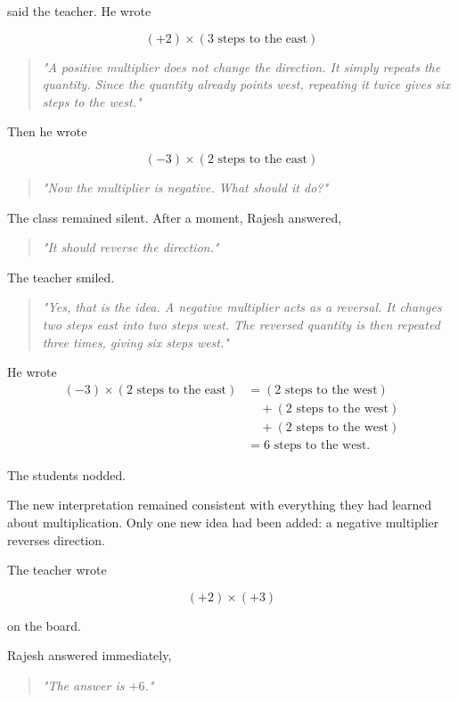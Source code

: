 \documentclass[11pt]{article}
\begin{document}
said the teacher.  He wrote

\[
(+2)\times(\text{3 steps to the east})
\]

\begin{quote}
\emph{"A positive multiplier does not change the direction. It simply repeats the quantity. Since the quantity already points west, repeating it twice gives six steps to the west."}
\end{quote}

Then he wrote

\[
(-3)\times(\text{2 steps to the east})
\]

\begin{quote}
\emph{"Now the multiplier is negative. What should it do?"}
\end{quote}

The class remained silent. After a moment, Rajesh answered,

\begin{quote}
\emph{"It should reverse the direction."}
\end{quote}

The teacher smiled.

\begin{quote}
\emph{"Yes, that is the idea. A negative multiplier acts as a reversal. It changes two steps east into two steps west. The reversed quantity is then repeated three times, giving six steps west."}
\end{quote}

He wrote
\[
\begin{aligned}
(-3)\times(\text{2 steps to the east})
&=(\text{2 steps to the west}) \\
&\quad+(\text{2 steps to the west}) \\
&\quad+(\text{2 steps to the west}) \\
&=\text{6 steps to the west}.
\end{aligned}
\]

The students nodded.

The new interpretation remained consistent with everything they had learned about multiplication. Only one new idea had been added: a negative multiplier reverses direction.

The teacher wrote

\[
(+2)\times(+3)
\]

on the board.

Rajesh answered immediately,

\begin{quote}
\emph{"The answer is \(+6\)."}
\end{quote}
\end{document}
